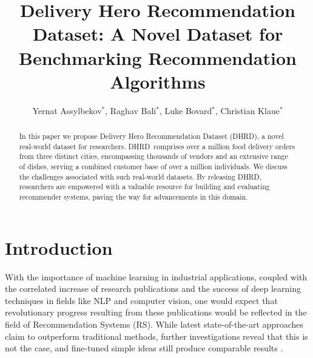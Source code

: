 \documentclass[manuscript]{acmart}
\newcommand{\dname}{DHRD}
\begin{document}
\title{Delivery Hero Recommendation Dataset: A Novel Dataset for Benchmarking Recommendation Algorithms}

\author{Yernat Assylbekov$^*$, Raghav Bali$^*$, Luke Bovard$^*$, Christian Klaue$^*$}
\def\thefootnote{*}\def\thefootnote{\arabic{footnote}}

\begin{abstract}
In this paper we propose Delivery Hero Recommendation
Dataset (\dname), a novel real-world dataset for researchers.
\dname\ comprises over a million food delivery orders from three distinct
cities, encompassing thousands of vendors and an extensive range of
dishes, serving a combined customer base of over a million individuals.
We discuss the challenges associated with such real-world datasets. By
releasing \dname, researchers are empowered with a valuable resource for
building and evaluating recommender systems, paving the way for
advancements in this domain.
\end{abstract}

\maketitle

\section{Introduction}
\label{sec:intro}
With the importance of machine learning in industrial applications,
coupled with the correlated increase of research publications and the
success of deep learning techniques in fields like NLP and computer
vision, one would expect that revolutionary progress resulting from these
publications would be reflected in the field of Recommendation Systems
(RS). While latest state-of-the-art approaches claim to outperform
traditional methods, further investigations reveal that this is not the
case, and fine-tuned simple ideas still produce comparable
results \cite{muller18a}.  
\end{document}
